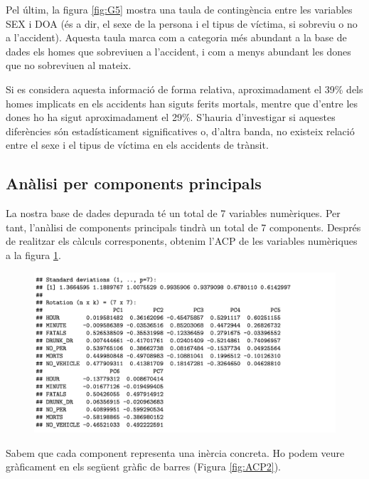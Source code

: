 \documentclass[12pt,longbibliography]{article}
\theoremstyle{definition}
\theoremstyle{remark}
\begin{document}
Pel últim, la figura \ref{fig:G5} mostra una taula de contingència entre les variables SEX i DOA (és a dir, el sexe de la persona i el tipus de víctima, si sobreviu o no a l'accident). Aquesta taula marca com a categoria més abundant a la base de dades els homes que sobreviuen a l'accident, i com a menys abundant les dones que no sobreviuen al mateix. 


Si es considera aquesta informació de forma relativa, aproximadament el 39\% dels homes implicats en els accidents han siguts ferits mortals, mentre que d'entre les dones ho ha sigut aproximadament el 29\%. S'hauria d'investigar si aquestes diferències són estadísticament significatives o, d'altra banda, no existeix relació entre el sexe i el tipus de víctima en els accidents de trànsit.


\subsection{Anàlisi per components principals}


La nostra base de dades depurada té un total de 7 variables numèriques. Per tant, l'anàlisi de components principals tindrà un total de 7 components. Després de realitzar els càlculs corresponents, obtenim l'ACP de les variables numèriques a la figura \ref{fig:ACP1}.

\begin{figure}[H]
\begin{center}
\includegraphics[width=14.5cm]{acp1}
\end{center}
\label{fig:ACP1}
\end{figure}


Sabem que cada component representa una inèrcia concreta. Ho podem veure gràficament en els següent gràfic de barres (Figura \ref{fig:ACP2}).
\end{document}
